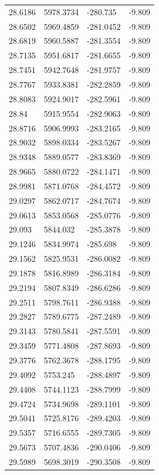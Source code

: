 \begin{table}[H]
\begin{tabular}{llll}
28.6186 & 5978.3734 & -280.735 & -9.809 \\
28.6502 & 5969.4859 & -281.0452 & -9.809 \\
28.6819 & 5960.5887 & -281.3554 & -9.809 \\
28.7135 & 5951.6817 & -281.6655 & -9.809 \\
28.7451 & 5942.7648 & -281.9757 & -9.809 \\
28.7767 & 5933.8381 & -282.2859 & -9.809 \\
28.8083 & 5924.9017 & -282.5961 & -9.809 \\
28.84 & 5915.9554 & -282.9063 & -9.809 \\
28.8716 & 5906.9993 & -283.2165 & -9.809 \\
28.9032 & 5898.0334 & -283.5267 & -9.809 \\
28.9348 & 5889.0577 & -283.8369 & -9.809 \\
28.9665 & 5880.0722 & -284.1471 & -9.809 \\
28.9981 & 5871.0768 & -284.4572 & -9.809 \\
29.0297 & 5862.0717 & -284.7674 & -9.809 \\
29.0613 & 5853.0568 & -285.0776 & -9.809 \\
29.093 & 5844.032 & -285.3878 & -9.809 \\
29.1246 & 5834.9974 & -285.698 & -9.809 \\
29.1562 & 5825.9531 & -286.0082 & -9.809 \\
29.1878 & 5816.8989 & -286.3184 & -9.809 \\
29.2194 & 5807.8349 & -286.6286 & -9.809 \\
29.2511 & 5798.7611 & -286.9388 & -9.809 \\
29.2827 & 5789.6775 & -287.2489 & -9.809 \\
29.3143 & 5780.5841 & -287.5591 & -9.809 \\
29.3459 & 5771.4808 & -287.8693 & -9.809 \\
29.3776 & 5762.3678 & -288.1795 & -9.809 \\
29.4092 & 5753.245 & -288.4897 & -9.809 \\
29.4408 & 5744.1123 & -288.7999 & -9.809 \\
29.4724 & 5734.9698 & -289.1101 & -9.809 \\
29.5041 & 5725.8176 & -289.4203 & -9.809 \\
29.5357 & 5716.6555 & -289.7305 & -9.809 \\
29.5673 & 5707.4836 & -290.0406 & -9.809 \\
29.5989 & 5698.3019 & -290.3508 & -9.809 \\

\end{tabular}
\end{table}
